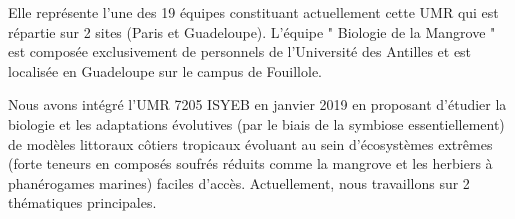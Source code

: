     Elle représente l'une des 19 équipes constituant actuellement cette UMR qui est répartie sur 2 sites (Paris et Guadeloupe). L'équipe " Biologie de la Mangrove " est composée exclusivement de personnels de l'Université des Antilles et est localisée en Guadeloupe sur le campus de Fouillole.

    Nous avons intégré l'UMR 7205 ISYEB en janvier 2019 en proposant d'étudier la biologie et les adaptations évolutives (par le biais de la symbiose essentiellement) de modèles littoraux côtiers tropicaux évoluant au sein d'écosystèmes extrêmes (forte teneurs en composés soufrés réduits comme la mangrove et les herbiers à phanérogames marines) faciles d'accès. Actuellement, nous travaillons sur 2 thématiques principales.